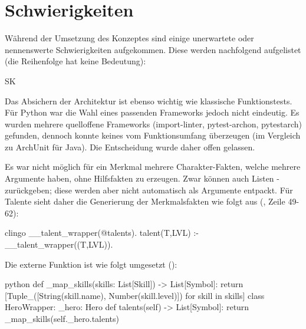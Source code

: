\section{Schwierigkeiten}\label{sec:probleme}

Während der Umsetzung des Konzeptes sind einige unerwartete oder nennenswerte Schwierigkeiten aufgekommen.
Diese werden nachfolgend aufgelistet (die Reihenfolge hat keine Bedeutung):

\begin{enumerateWithCode}{SK}
    \item Das Absichern der Architektur ist ebenso wichtig wie klassische Funktionstests.
    Für Python war die Wahl eines passenden Frameworks jedoch nicht eindeutig.
    Es wurden mehrere quelloffene Frameworks (import-linter, pytest-archon,
    pytestarch) gefunden, dennoch konnte keines vom Funktionsumfang überzeugen (im Vergleich zu ArchUnit für Java).
    Die Entscheidung wurde daher offen gelassen.

    \item Es war nicht möglich für ein Merkmal mehrere Charakter-Fakten, welche mehrere Argumente haben, ohne Hilfsfakten zu erzeugen.
    Zwar können  auch Listen \bzw {}- zurückgeben; diese werden aber nicht automatisch als Argumente entpackt.
    Für \zB Talente sieht daher die Generierung der Merkmalsfakten wie folgt aus (\vgl {}, Zeile 49-62):
    \begin{mintedNameless}{clingo}
__talent_wrapper(@talents).
talent(T,LVL) :- __talent_wrapper((T,LVL)).
    \end{mintedNameless}

    Die externe Funktion  ist wie folgt umgesetzt (\vgl {}):
    \begin{mintedNameless}{python}
def _map_skills(skills: List[Skill]) -> List[Symbol]:
    return [Tuple_([String(skill.name), Number(skill.level)]) for skill in skills]
class HeroWrapper:
    _hero: Hero
    def talents(self) -> List[Symbol]:
        return _map_skills(self._hero.talents)
    \end{mintedNameless}


\end{enumerateWithCode}

